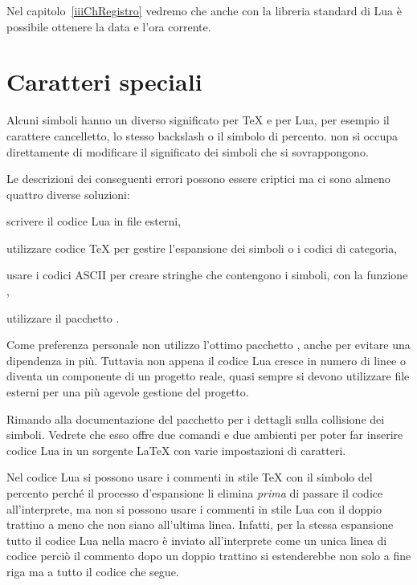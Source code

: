 Nel capitolo~\ref{iiiChRegistro} vedremo che anche con la libreria standard di
Lua è possibile ottenere la data e l'ora corrente.


\section{Caratteri speciali}

Alcuni simboli hanno un diverso significato per \TeX{} e per Lua, per esempio il
carattere cancelletto, lo stesso backslash o il simbolo di percento. \LuaTeX{}
non si occupa direttamente di modificare il significato dei simboli che si
sovrappongono.

Le descrizioni dei conseguenti errori possono essere criptici ma ci sono almeno
quattro diverse soluzioni:
\begin{compactitemize}
\item scrivere il codice Lua in file esterni,
\item utilizzare codice \TeX{} per gestire l'espansione dei simboli o i codici
di categoria,
\item usare i codici ASCII per creare stringhe che contengono i simboli, con la
funzione ,
\item utilizzare il pacchetto .
\end{compactitemize}

Come preferenza personale non utilizzo l'ottimo pacchetto ,
anche per evitare una dipendenza in più. Tuttavia non appena il codice Lua
cresce in numero di linee o diventa un componente di un progetto reale, quasi
sempre si devono utilizzare file esterni per una più agevole gestione del
progetto.

Rimando alla documentazione del pacchetto  per i dettagli sulla
collisione dei simboli. Vedrete che esso offre due comandi e due ambienti per
poter far inserire codice Lua in un sorgente \LaTeX{} con varie impostazioni di
caratteri.

Nel codice Lua si possono usare i commenti in stile \TeX{} con il simbolo del
percento perché il processo d'espansione li elimina \emph{prima} di passare il
codice all'interprete, ma non si possono usare i commenti in stile Lua con il
doppio trattino a meno che non siano all'ultima linea. Infatti, per la stessa
espansione tutto il codice Lua nella macro  è inviato
all'interprete come un unica linea di codice perciò il commento dopo un doppio
trattino si estenderebbe non solo a fine riga ma a tutto il codice che segue.

